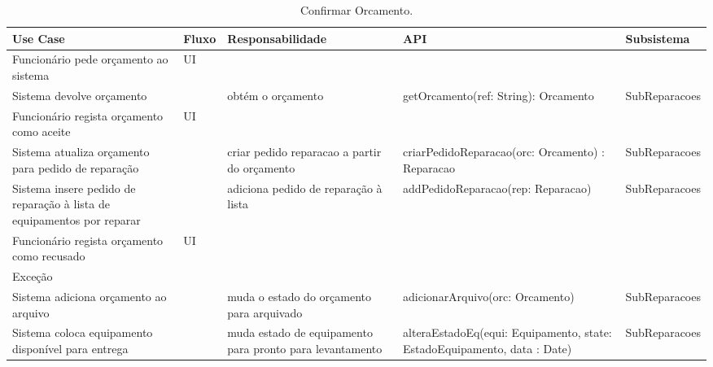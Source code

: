 \documentclass[../relatorio.tex]{subfiles}
\begin{document}
\begin{landscape}
    \begin{table}[!h]
        \centering
        \begin{tabular}{|p{5cm}|p{1cm}|p{4cm}|p{6cm}|p{3cm}|}
            \hline
            \rowcolor{gray!20!white}
            Use Case & Fluxo                                            & Responsabilidade & API & Subsistema \\
            \hline
            \rowcolor{yellow}
            Funcionário pede orçamento ao sistema
                     & UI
                     & 
                     & 
                     & 
            \\
            \hline
            Sistema devolve orçamento
                     & 
                     & obtém o orçamento
                     & getOrcamento(ref: String): Orcamento
                     & SubReparacoes
            \\
            \hline
            \rowcolor{yellow}
            Funcionário regista orçamento como aceite
                     & UI
                     & 
                     & 
                     & 
            \\
            \hline
            Sistema atualiza orçamento para pedido de reparação
                     & 
                     & criar pedido reparacao a partir do orçamento
                     & criarPedidoReparacao(orc: Orcamento) : Reparacao
                     & SubReparacoes
            \\
            \hline
            Sistema insere pedido de reparação à lista de equipamentos por reparar
                     & 
                     & adiciona pedido de reparação à lista
                     & addPedidoReparacao(rep: Reparacao)
                     & SubReparacoes
            \\
            \hline
            \rowcolor{yellow}
            Funcionário regista orçamento como recusado
                     & UI
                     & 
                     & 
                     & 
            \\
            \hline
            \rowcolor{red!30}
            Exceção  &                                                  &                  &     &            \\
            \hline
            Sistema adiciona orçamento ao arquivo
                     & 
                     & muda o estado do orçamento para arquivado
                     & adicionarArquivo(orc: Orcamento)
                     & SubReparacoes
            \\
            \hline
            Sistema coloca equipamento disponível para entrega
                     & 
                     & muda estado de equipamento para pronto para levantamento
                     & alteraEstadoEq(equi: Equipamento, state: EstadoEquipamento, data : Date)
                     & SubReparacoes
            \\
            \hline
        \end{tabular}
        \caption{Confirmar Orcamento.}
    \end{table}
\end{landscape}
\end{document}
